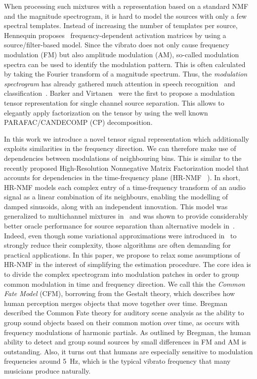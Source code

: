 When processing such mixtures with a representation based on a standard NMF and the magnitude spectrogram, it is hard to model the sources with only a few spectral templates. Instead of increasing the number of templates per source, Hennequin proposes~\cite{hennequin11} frequency-dependent activation matrices by using a source/filter-based model.
Since the vibrato does not only cause frequency modulation (FM) but also amplitude modulation (AM), so-called modulation spectra can be used to identify the modulation pattern. This is often calculated by taking the Fourier transform of a magnitude spectrum. Thus, the \emph{modulation spectrogram} has already gathered much attention in speech recognition~\cite{greenberg97,kingsbury98} and classification~\cite{kinnunen08, markaki09}.
Barker and Virtanen~\cite{barker13} were the first to propose a modulation tensor representation for single channel source separation. This allows to elegantly apply factorization on the tensor by using the well known PARAFAC/CANDECOMP (CP) decomposition.

In this work we introduce a novel tensor signal representation which additionally exploits similarities in the frequency direction. We can therefore make use of dependencies between modulations of neighbouring bins. This is similar to the recently proposed High-Resolution Nonnegative Matrix Factorization
model that accounts for dependencies in the time-frequency plane (HR-NMF
~\cite{badeau11}). In short, HR-NMF models each complex entry of a time-frequency transform of an audio signal as a linear combination of its neighbours, enabling the modelling of damped sinusoids, along with an independent
innovation. This model was generalized to multichannel mixtures in~\cite{badeau13a,badeau14}
and was shown to provide considerably better oracle performance for source separation than alternative models in~\cite{magron15a}.
Indeed, even though some variational approximations were introduced
in~\cite{badeau13} to strongly reduce their complexity,
those algorithms are often demanding for practical applications.
In this paper, we propose to relax some assumptions of HR-NMF in the interest of simplifying the estimation procedure. The core idea is to divide the complex spectrogram into modulation patches in order to group common modulation in time and frequency direction. We call this the \emph{Common Fate Model} (CFM), borrowing from the Gestalt theory, which describes how human perception merges objects that move together over time. Bregman~\cite{bregman94} described the Common Fate theory for auditory scene analysis as the ability to group sound objects based on their common motion over time, as occurs with frequency modulations of harmonic partials. As outlined by Bregman, the human ability to detect and group sound sources by small differences in FM and AM is outstanding. Also, it turns out that humans are especially sensitive to modulation frequencies around 5~Hz, which is the typical vibrato frequency that many musicians produce naturally.

